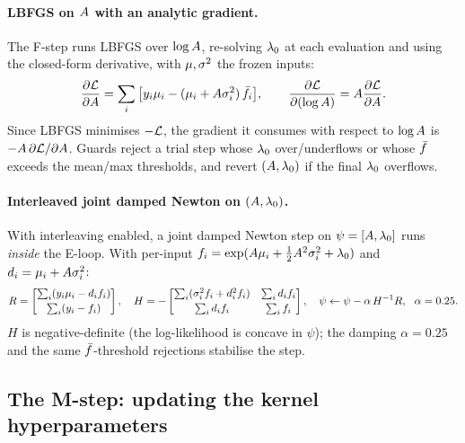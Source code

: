 \paragraph{LBFGS on $A$ with an analytic gradient.}
The F-step runs LBFGS over $\log A$, re-solving $\lambda_{0}$ at each evaluation and
using the closed-form derivative, with $\mu,\sigma^{2}$ the frozen inputs:
\begin{equation}
\frac{\partial\mathcal{L}}{\partial A}
  = \sum_i\big[y_i\mu_i-(\mu_i+A\sigma^{2}_i)\,\bar{f}_i\big],
\qquad
\frac{\partial\mathcal{L}}{\partial(\log A)}=A\frac{\partial\mathcal{L}}{\partial A}.
\end{equation}
Since LBFGS minimises $-\mathcal{L}$, the gradient it consumes with respect to
$\log A$ is $-A\,\partial\mathcal{L}/\partial A$. Guards reject a trial step
whose $\lambda_{0}$ over/underflows or whose $\bar{f}$ exceeds the mean/max thresholds,
and revert $(A,\lambda_{0})$ if the final $\lambda_{0}$ overflows.

\paragraph{Interleaved joint damped Newton on $(A,\lambda_{0})$.}
With interleaving enabled, a joint damped Newton step on $\psi=[A,\lambda_{0}]$ runs
\emph{inside} the E-loop. With per-input
$f_i=\exp(A\mu_i+\tfrac12A^2\sigma^{2}_i+\lambda_{0})$ and
$d_i=\mu_i+A\sigma^{2}_i$:
\begin{equation}
R=\begin{bmatrix}\sum_i(y_i\mu_i-d_if_i)\\[2pt]\sum_i(y_i-f_i)\end{bmatrix},
\quad
H=-\begin{bmatrix}\sum_i(\sigma^{2}_if_i+d_i^2f_i)&\sum_i d_if_i\\[2pt]
                  \sum_i d_if_i&\sum_if_i\end{bmatrix},
\quad
\psi\leftarrow\psi-\alpha\,H^{-1}R,\ \ \alpha=0.25.
\end{equation}
$H$ is negative-definite (the log-likelihood is concave in $\psi$); the damping
$\alpha=0.25$ and the same $\bar{f}$-threshold rejections stabilise the step.

\subsection{The M-step: updating the kernel hyperparameters}
\label{subsec:mstep}

